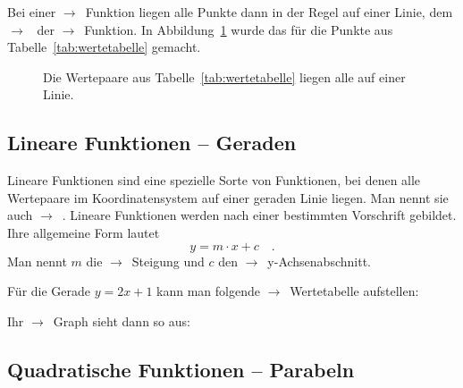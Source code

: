 \documentclass{scrartcl}
\newcommand*\siehe{$\rightarrow$~}
\newcommand*\begriff{\siehe\ac}
\newcounter{beispiel}
\begin{document}
Bei einer \begriff{Funktion} liegen alle Punkte dann in der Regel auf einer
Linie, dem \siehe{} der \begriff{Funktion}.  In
Abbildung~\ref{fig:wertepaare-linie} wurde das für die Punkte aus
Tabelle~\ref{tab:wertetabelle} gemacht.

\begin{figure}
  \centering
  \caption{Die Wertepaare aus Tabelle~\ref{tab:wertetabelle} liegen alle auf
    einer Linie.}
  \label{fig:wertepaare-linie}
\end{figure}

\subsection{Lineare Funktionen -- Geraden}

Lineare Funktionen sind eine spezielle Sorte von Funktionen, bei denen alle
Wertepaare im Koordinatensystem auf einer geraden Linie liegen.  Man nennt sie
auch \siehe{}.  Lineare Funktionen werden nach einer bestimmten
Vorschrift gebildet.  Ihre allgemeine Form lautet
\begin{equation}
  \label{eq:lineare-funktion}
  y = m\cdot x + c \quad.
\end{equation}
Man nennt $m$ die \begriff{Steigung} und $c$ den \begriff{y-Achsenabschnitt}.

\begin{beispiel}
  Für die Gerade $y=2x+1$ kann man folgende \begriff{Wertetabelle} aufstellen:
  \begin{center}
  \end{center}
  Ihr \begriff{Graph} sieht dann so aus:
  \begin{center}
  \end{center}
\end{beispiel}


\subsection{Quadratische Funktionen -- Parabeln}

\printacronyms
\end{document}
